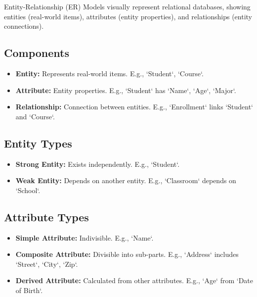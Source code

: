 \vspace{-0.1cm}

\noindent
Entity-Relationship (ER) Models visually represent relational databases, showing entities (real-world items), attributes (entity properties), and relationships (entity connections).

\vspace{-0.3cm}
\subsection*{Components}
\vspace{-0.1cm}

\begin{itemize}[noitemsep,leftmargin=*]
\leftskip-\dimexpr\leftmargin %
\item[] \textbf{Entity:} Represents real-world items. E.g., `Student`, `Course`.
\item[] \textbf{Attribute:} Entity properties. E.g., `Student` has `Name`, `Age`, `Major`.
\item[] \textbf{Relationship:} Connection between entities. E.g., `Enrollment` links `Student` and `Course`.
\end{itemize}

\vspace{-0.3cm}
\subsection*{Entity Types}
\vspace{-0.1cm}

\begin{itemize}[noitemsep,leftmargin=*]
\leftskip-\dimexpr\leftmargin %
\item[] \textbf{Strong Entity:} Exists independently. E.g., `Student`.
\item[] \textbf{Weak Entity:} Depends on another entity. E.g., `Classroom` depends on `School`.
\end{itemize}

\vspace{-0.3cm}
\subsection*{Attribute Types}
\vspace{-0.1cm}

\begin{itemize}[noitemsep,leftmargin=*]
\leftskip-\dimexpr\leftmargin %
\item[] \textbf{Simple Attribute:} Indivisible. E.g., `Name`.
\item[] \textbf{Composite Attribute:} Divisible into sub-parts. E.g., `Address` includes `Street`, `City`, `Zip`.
\item[] \textbf{Derived Attribute:} Calculated from other attributes. E.g., `Age` from `Date of Birth`.
\end{itemize}

